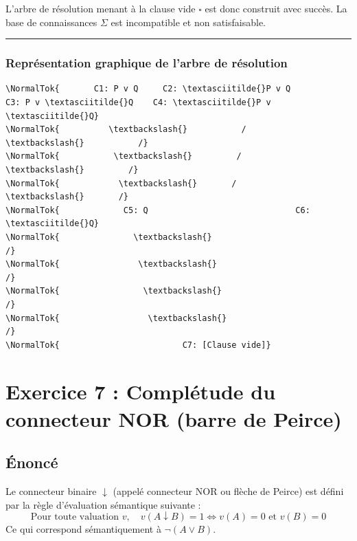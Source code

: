 \documentclass[11pt,a4paper]{article}
\begin{document}
L'arbre de résolution menant à la clause vide \(\square\) est donc
construit avec succès. La base de connaissances \(\Sigma\) est
incompatible et non satisfaisable.

\begin{center}\rule{0.5\linewidth}{0.5pt}\end{center}

\hypertarget{repruxe9sentation-graphique-de-larbre-de-ruxe9solution}{%
\subsubsection{Représentation graphique de l'arbre de
résolution}\label{repruxe9sentation-graphique-de-larbre-de-ruxe9solution}}

\begin{lstlisting}
\NormalTok{       C1: P v Q     C2: \textasciitilde{}P v Q           C3: P v \textasciitilde{}Q    C4: \textasciitilde{}P v \textasciitilde{}Q}
\NormalTok{          \textbackslash{}           /                      \textbackslash{}           /}
\NormalTok{           \textbackslash{}         /                        \textbackslash{}         /}
\NormalTok{            \textbackslash{}       /                          \textbackslash{}       /}
\NormalTok{             C5: Q                              C6: \textasciitilde{}Q}
\NormalTok{               \textbackslash{}                                  /}
\NormalTok{                \textbackslash{}                                /}
\NormalTok{                 \textbackslash{}                              /}
\NormalTok{                  \textbackslash{}                            /}
\NormalTok{                         C7: [Clause vide]}
\end{lstlisting}
\n
\hypertarget{exercice-7-compluxe9tude-du-connecteur-nor-barre-de-peirce}{%
\section{Exercice 7 : Complétude du connecteur NOR (barre de
Peirce)}\label{exercice-7-compluxe9tude-du-connecteur-nor-barre-de-peirce}}

\hypertarget{uxe9noncuxe9}{%
\subsection{Énoncé}\label{uxe9noncuxe9}}

Le connecteur binaire \(\downarrow\) (appelé connecteur NOR ou flèche de
Peirce) est défini par la règle d'évaluation sémantique suivante :
\[\text{Pour toute valuation } v, \quad v(A \downarrow B) = 1 \iff v(A) = 0 \text{ et } v(B) = 0\]
Ce qui correspond sémantiquement à \(\neg(A \lor B)\).
\end{document}
